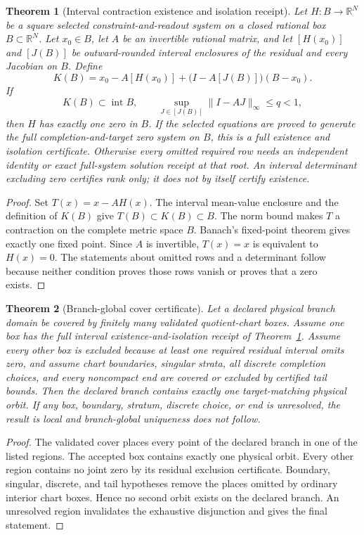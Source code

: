\documentclass[11pt]{article}
\newtheorem{theorem}{Theorem}[section]
\theoremstyle{remark}
\theoremstyle{plain}
\begin{document}
\begin{theorem}[Interval contraction existence and isolation receipt]
\label{thm:interval-locking}
Let \(H:B\to\mathbb R^N\) be a square selected constraint-and-readout system on a closed rational
box \(B\subset\mathbb R^N\). Let \(x_0\in B\), let \(A\) be an invertible rational matrix, and
let \([H(x_0)]\) and \([J(B)]\) be outward-rounded interval enclosures of the residual and every
Jacobian on \(B\). Define
\[
K(B)=x_0-A[H(x_0)]+\bigl(I-A[J(B)]\bigr)(B-x_0).
\]
If
\[
K(B)\subset\operatorname{int}B,
\qquad
\sup_{J\in[J(B)]}\|I-AJ\|_\infty\le q<1,
\]
then \(H\) has exactly one zero in \(B\). If the selected equations are proved to generate the
full completion-and-target zero system on \(B\), this is a full existence and isolation
certificate. Otherwise every omitted required row needs an independent identity or exact
full-system solution receipt at that root. An interval determinant excluding zero certifies rank
only; it does not by itself certify existence.
\end{theorem}

\begin{proof}
Set \(T(x)=x-AH(x)\). The interval mean-value enclosure and the definition of \(K(B)\) give
\(T(B)\subset K(B)\subset B\). The norm bound makes \(T\) a contraction on the complete metric
space \(B\). Banach's fixed-point theorem gives exactly one fixed point. Since \(A\) is invertible,
\(T(x)=x\) is equivalent to \(H(x)=0\). The statements about omitted rows and a determinant follow
because neither condition proves those rows vanish or proves that a zero exists.
\end{proof}

\begin{theorem}[Branch-global cover certificate]
Let a declared physical branch domain be covered by finitely many validated quotient-chart boxes.
Assume one box has the full interval existence-and-isolation receipt of
Theorem~\ref{thm:interval-locking}. Assume every other box is excluded because at least one
required residual interval omits zero, and assume chart boundaries, singular strata, all discrete
completion choices, and every noncompact end are covered or excluded by certified tail bounds.
Then the declared branch contains exactly one target-matching physical orbit. If any box, boundary,
stratum, discrete choice, or end is unresolved, the result is local and branch-global
uniqueness does not follow.
\end{theorem}

\begin{proof}
The validated cover places every point of the declared branch in one of the listed regions. The
accepted box contains exactly one physical orbit. Every other region contains no joint zero by its
residual exclusion certificate. Boundary, singular, discrete, and tail hypotheses remove the
places omitted by ordinary interior chart boxes. Hence no second orbit exists on the declared
branch. An unresolved region invalidates the exhaustive disjunction and gives the final statement.
\end{proof}
\end{document}
